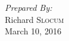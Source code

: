 \begin{titlepage}

\Large \emph{Prepared By:}\\
Richard \textsc{Slocum}\\[7cm] %


{\large March 10, 2016}\\[3cm] %


 

\vfill %

\end{titlepage}